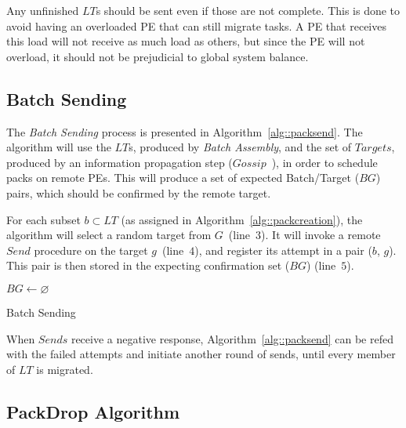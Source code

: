 Any unfinished $LT$s should be sent even if those are not complete.
This is done to avoid having an overloaded PE that can still migrate tasks.
A PE that receives this load will not receive as much load as others, but since the PE will not overload, it should not be prejudicial to global system balance.

\subsection{Batch Sending} \label{sec:algo:sending}

The \textit{Batch Sending} process is presented in Algorithm~\ref{alg::packsend}.
The algorithm will use the $LT$s, produced by \textit{Batch Assembly}, and the set of $Targets$, produced by an information propagation step ($Gossip$~\cite{gossip}), in order to schedule packs on remote PEs.
This will produce a set of expected Batch/Target ($BG$) pairs, which should be confirmed by the remote target.

For each subset $b \subset LT$ (as assigned in Algorithm~\ref{alg::packcreation}), the algorithm will select a random target from $G$~(line~$3$).
It will invoke a remote $Send$ procedure on the target $g$~(line~$4$), and register its attempt in a pair ($b$, $g$).
This pair is then stored in the expecting confirmation set ($BG$) (line~$5$).


\begin{algorithm}[!ht]
    \DontPrintSemicolon
    $BG \gets \varnothing$ \\
    \caption{Batch Sending}  
    \label{alg::packsend}
\end{algorithm}

When $Sends$ receive a negative response, Algorithm~\ref{alg::packsend} can be refed with the failed attempts and initiate another round of sends, until every member of $LT$ is migrated.

\subsection{PackDrop Algorithm} \label{sec:algo:main}

